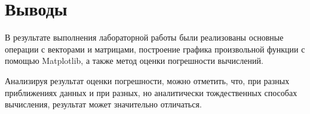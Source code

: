 \documentclass[a4paper, 14pt]{extarticle}
\begin{document}
\section{Выводы}
В результате выполнения лабораторной работы были реализованы основные операции с векторами и матрицами, построение графика произвольной функции с помощью Matplotlib, а также метод оценки погрешности вычислений.

Анализируя результат оценки погрешности, можно отметить, что, при разных приближениях данных и при разных, но аналитически тождественных способах вычисления, результат может значительно отличаться.
\end{document}
